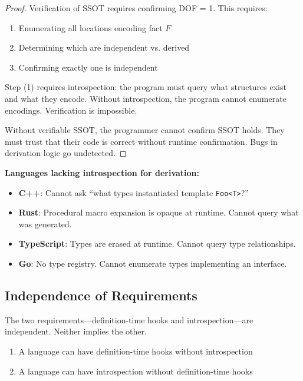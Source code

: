 \begin{proof}
Verification of SSOT requires confirming DOF = 1. This requires:
\begin{enumerate}
\tightlist
\item Enumerating all locations encoding fact $F$
\item Determining which are independent vs. derived
\item Confirming exactly one is independent
\end{enumerate}

Step (1) requires introspection: the program must query what structures exist and what they encode. Without introspection, the program cannot enumerate encodings. Verification is impossible.

Without verifiable SSOT, the programmer cannot confirm SSOT holds. They must trust that their code is correct without runtime confirmation. Bugs in derivation logic go undetected.
\end{proof}

\textbf{Languages lacking introspection for derivation:}

\begin{itemize}
\tightlist
\item \textbf{C++}: Cannot ask ``what types instantiated template \texttt{Foo<T>}?''
\item \textbf{Rust}: Procedural macro expansion is opaque at runtime. Cannot query what was generated.
\item \textbf{TypeScript}: Types are erased at runtime. Cannot query type relationships.
\item \textbf{Go}: No type registry. Cannot enumerate types implementing an interface.
\end{itemize}

\subsection{Independence of Requirements}\label{sec:independence}

The two requirements---definition-time hooks and introspection---are independent. Neither implies the other.

\begin{theorem}\label{thm:independence}
\begin{enumerate}
\tightlist
\item A language can have definition-time hooks without introspection
\item A language can have introspection without definition-time hooks
\end{enumerate}
\end{theorem}

